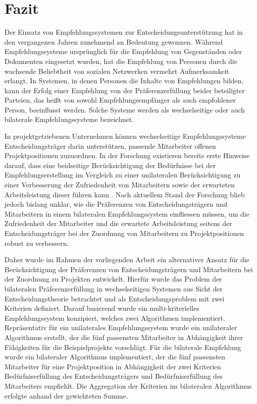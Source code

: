 
\chapter{Fazit}
\label{ch:fazit}
Der Einsatz von Empfehlungssystemen zur Entscheidungsunterstützung hat in den vergangenen Jahren zunehmend an Bedeutung gewonnen.
Während Empfehlungssysteme ursprünglich für die Empfehlung von Gegenständen oder Dokumenten eingesetzt wurden, hat die Empfehlung von Personen durch die wachsende Beliebtheit von sozialen Netzwerken vermehrt Aufmerksamkeit erlangt.
In Systemen, in denen Personen die Inhalte von Empfehlungen bilden, kann der Erfolg einer Empfehlung von der Präferenzerfüllung beider beteiligter Parteien, das heißt von sowohl Empfehlungsempfänger als auch empfohlener Person, beeinflusst werden.
Solche Systeme werden als wechselseitige oder auch bilaterale Empfehlungssysteme bezeichnet.

In projektgetriebenen Unternehmen können wechselseitige Empfehlungssysteme Entscheidungsträger darin unterstützen, passende Mitarbeiter offenen Projektpositionen zuzuordnen.
In der Forschung existieren bereits erste Hinweise darauf, dass eine beidseitige Berücksichtigung der Bedürfnisse bei der Empfehlungserstellung im Vergleich zu einer unilateralen Berücksichtigung zu einer Verbesserung der Zufriedenheit von Mitarbeitern sowie der erwarteten Arbeitsleistung dieser führen kann \cite[S. 3]{link:booklet}.
Nach aktuellem Stand der Forschung blieb jedoch bislang unklar, wie die Präferenzen von Entscheidungsträgern und Mitarbeitern in einem bilateralen Empfehlungssystem einfliessen müssen, um die Zufriedenheit der Mitarbeiter und die erwartete Arbeitsleistung seitens der Entscheidungsträger bei der Zuordnung von Mitarbeitern zu Projektpositionen robust zu verbessern.

Daher wurde im Rahmen der vorliegenden Arbeit ein alternativer Ansatz für die Berücksichtigung der Präferenzen von Entscheidungsträgern und Mitarbeitern bei der Zuordnung zu Projekten entwickelt.
Hierfür wurde das Problem der bilateralen Präferenzerfüllung in wechselseitigen Systemen aus Sicht der Entscheidungstheorie betrachtet und als Entscheidungsproblem mit zwei Kriterien definiert.
Darauf basierend wurde ein multi-kriterielles Empfehlungssystem konzipiert, welches zwei Algorithmen implementiert.
Repräsentativ für ein unilaterales Empfehlungssystem wurde ein unilateraler Algorithmus erstellt, der die fünf passensten Mitarbeiter in Abhängigkeit ihrer Fähigkeiten für die Beispielprojekte vorschlägt.
Für die bilaterale Empfehlung wurde ein bilateraler Algorithmus implementiert, der die fünf passensten Mitarbeiter für eine Projektposition in Abhängigkeit der zwei Kriterien Bedürfniserfüllung des Entscheidungsträgers und Bedürfniserfüllung des Mitarbeiters empfiehlt.
Die Aggregation der Kriterien im bilateralen Algorithmus erfolgte anhand der gewichteten Summe.

